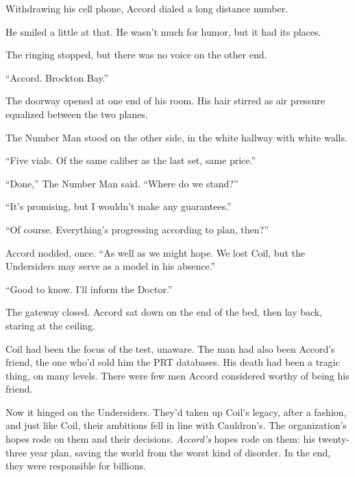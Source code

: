 Withdrawing his cell phone, Accord dialed a long distance number.



He smiled a little at that.  He wasn't much for humor, but it had its places.



The ringing stopped, but there was no voice on the other end.



``Accord.  Brockton Bay.''



The doorway opened at one end of his room.  His hair stirred as air pressure equalized between the two planes.



The Number Man stood on the other side, in the white hallway with white walls.



``Five vials.  Of the same caliber as the last set, same price.''



``Done,'' The Number Man said.  ``Where do we stand?''



``It's promising, but I wouldn't make any guarantees.''



``Of course.  Everything's progressing according to plan, then?''



Accord nodded, once.  ``As well as we might hope.  We lost Coil, but the Undersiders may serve as a model in his absence.''



``Good to know.  I'll inform the Doctor.''



The gateway closed.  Accord sat down on the end of the bed, then lay back, staring at the ceiling.



Coil had been the focus of the test, unaware.  The man had also been Accord's friend, the one who'd sold him the PRT databases.  His death had been a tragic thing, on many levels.  There were few men Accord considered worthy of being his friend.



Now it hinged on the Undersiders.  They'd taken up Coil's legacy, after a fashion, and just like Coil, their ambitions fell in line with Cauldron's.  The organization's hopes rode on them and their decisions.  \emph{Accord's} hopes rode on them: his twenty-three year plan, saving the world from the worst kind of disorder.  In the end, they were responsible for billions.



